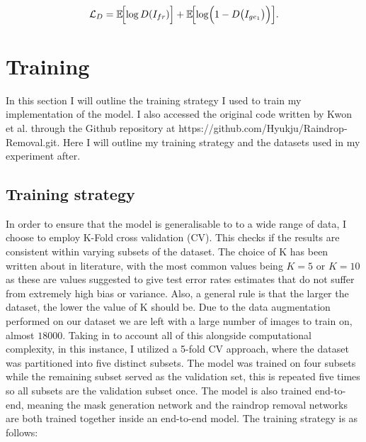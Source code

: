 \documentclass[11pt]{ociamthesis}  %
\begin{document}
\begin{equation}
\mathcal{L}_D = \mathbb{E}\!\Bigl[\log D(I_{fr})\Bigr]
+ \mathbb{E}\!\Bigl[\log\Bigl(1 - D\bigl(I_{ge_{1}}\bigr)\Bigr)\Bigr].
\label{Eq:Discriminator loss}
\end{equation}

\section{Training}
In this section I will outline the training strategy I used to train my implementation of the model. I also accessed the original code written by Kwon et al.\cite{Kwon} through the Github repository at https://github.com/Hyukju/Raindrop-Removal.git. Here I will outline my training strategy and the datasets used in my experiment after. 

\subsection{Training strategy}
\label{Section:Training strategy}
In order to ensure that the model is generalisable to to a wide range of data, I choose to employ K-Fold cross validation (CV)\cite{stone1974cross}. This checks if the results are consistent within varying subsets of the dataset. The choice of K has been written about in literature, with the most common values being $K=5$ or $K=10$ as these are values suggested to give test error rates estimates that do not suffer from extremely high bias or variance\cite{marcot2021optimal}\cite{nti2021performance}. Also, a general rule is that the larger the dataset, the lower the value of K should be\cite{Parmeet_Report}. Due to the data augmentation performed on our dataset we are left with a large number of images to train on, almost $18000$. Taking in to account all of this alongside computational complexity, in this instance, I utilized a 5-fold CV approach, where the dataset was partitioned into five distinct subsets. The model was trained on four subsets while the remaining subset served as the validation set, this is repeated five times so all subsets are the validation subset once. The model is also trained end-to-end, meaning the mask generation network and the raindrop removal networks are both trained together inside an end-to-end model. The training strategy is as follows:
\end{document}
